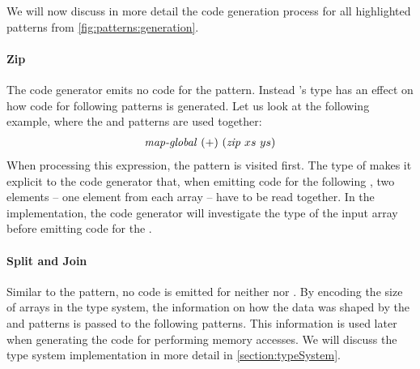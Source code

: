 We will now discuss in more detail the code generation process for all highlighted patterns from \autoref{fig:patterns:generation}.

\paragraph{Zip}
The code generator emits no \OpenCL code for the \zip pattern.
Instead \zip's type has an effect on how code for following patterns is generated.
Let us look at the following example, where the \zip and \mapGlobal patterns are used together:
\begin{align}
  \text{\textit{map-global}}\ (+)\ (\text{\textit{zip}}\ xs\ ys)
\end{align}
When processing this expression, the \zip pattern is visited first.
The type of \zip makes it explicit to the code generator that, when emitting code for the following \mapGlobal, two elements -- one element from each array -- have to be read together.
In the implementation, the code generator will investigate the type of the input array before emitting code for the \mapGlobal.

\paragraph{Split and Join}
Similar to the \zip pattern, no \OpenCL code is emitted for neither \splitN nor \join.
By encoding the size of arrays in the type system, the information on how the data was shaped by the \splitN and \join patterns is passed to the following patterns.
This information is used later when generating the \OpenCL code for performing \OpenCL memory accesses. 
We will discuss the type system implementation in more detail in \autoref{section:typeSystem}.

